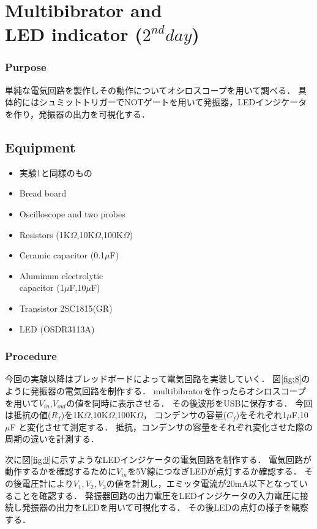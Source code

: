 \documentclass[11pt, a4paper,twocolumn]{jarticle}
\begin{document}
\section{Multibibrator and \\ LED indicator ($2^{nd} day$)}
\subsubsection{Purpose}
単純な電気回路を製作しその動作についてオシロスコープを用いて調べる．
具体的にはシュミットトリガーでNOTゲートを用いて発振器，LEDインジケータを作り，発振器の出力を可視化する．
\subsection{Equipment}
\begin{itemize}
    \item 実験1と同様のもの
    \item Bread board
    \item Oscilloscope and two probes
    \item Resistors (1K$\Omega$,10K$\Omega$,100K$\Omega$)
    \item Ceramic capacitor (0.1$\mu$F)
    \item Aluminum electrolytic \\ capacitor (1$\mu$F,10$\mu$F)
    \item Transistor 2SC1815(GR)
    \item LED (OSDR3113A)
\end{itemize}
\subsubsection{Procedure}
今回の実験以降はブレッドボードによって電気回路を実装していく．
図\ref{fig:8}のように発振器の電気回路を制作する．
multibibratorを作ったらオシロスコープを用いて$V_{in}$,$V_{out}$の値を同時に表示させる．
その後波形をUSBに保存する．
今回は抵抗の値($R_f$)を1K$\Omega$,10K$\Omega$,100K$\Omega$，
コンデンサの容量($C_f$)をそれぞれ1$\mu$F,10$\mu$F
と変化させて測定する．
抵抗，コンデンサの容量をそれぞれ変化させた際の周期の違いを計測する．

次に図\ref{fig:9}に示すようなLEDインジケータの電気回路を制作する．
電気回路が動作するかを確認するために$V_{in}$を5V線につなぎLEDが点灯するか確認する．
その後電圧計により$V_{1},V_{2},V_{3}$の値を計測し，エミッタ電流が20mA以下となっていることを確認する．
発振器回路の出力電圧をLEDインジケータの入力電圧に接続し発振器の出力をLEDを用いて可視化する．
その後LEDの点灯の様子を観察する．
\end{document}
